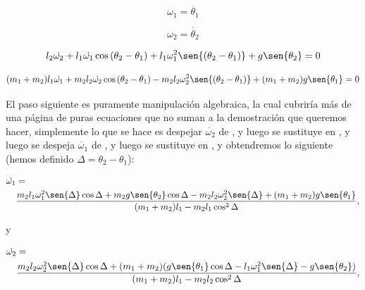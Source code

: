 \documentclass[a4paper,10pt]{article}
\numberwithin{equation}{section}
\begin{document}
\begin{equation}
 \omega_1 = \dot{\theta_1}
 \label{eq:pendu11}
\end{equation}

\begin{equation}
 \omega_2 = \dot{\theta_2}
 \label{eq:pendu12}
\end{equation}

\begin{equation}
 l_2 \dot{\omega_2} + l_1 \dot{\omega_1} \cos{(\theta_2 - \theta_1)} + l_1 \omega_1^2
 \sen{(\theta_2 - \theta_1)} + g \sen{\theta_2} = 0
 \label{eq:pendu13}
\end{equation}

\begin{equation}
 (m_1 + m_2)l_1 \dot{\omega_1} + m_2 l_2 \dot{\omega_2} \cos{(\theta_2 - \theta_1)}
 - m_2 l_2 \omega_2^2 \sen{(\theta_2 - \theta_1)} + (m_1 + m_2)g\sen{\theta_1} = 0 
 \label{eq:pendu14}
\end{equation}

El paso siguiente es puramente manipulación algebraica, la cual cubriría más de una 
página de puras ecuaciones que no suman a la demostración que queremos hacer, simplemente
lo que se hace es despejar $\dot{\omega_2}$ de , y luego se sustituye 
en , y luego se despeja $\dot{\omega_1}$ de , y luego se sustituye 
en , y obtendremos lo siguiente (hemos definido $\Delta = \theta_2 - \theta_1$):

\begin{align}
\begin{split}
\dot{\omega_1} &= \\
   &\frac{m_2 l_1 \omega_1^2 \sen{\Delta}\cos{\Delta}
 + m_2 g \sen{\theta_2}\cos{\Delta}-m_2 l_2 \omega_2^2\sen{\Delta} 
 +(m_1 + m_2)g \sen{\theta_1}}{(m_1 + m_2) l_1 - m_2 l_1 \cos^2{\Delta}},
\end{split}
 \end{align}

y

\begin{align}
\begin{split}
\dot{\omega_2} &= \\
   &\frac{m_2 l_2 \omega_2^2 \sen{\Delta}\cos{\Delta}
 + (m_1 + m_2)(g \sen{\theta_1}\cos{\Delta} - l_1 \omega_1^2\sen{\Delta}
 - g\sen{\theta_2})}{(m_1 + m_2) l_1 - m_2 l_2 \cos^2{\Delta}},
\end{split}
 \end{align}
\end{document}
